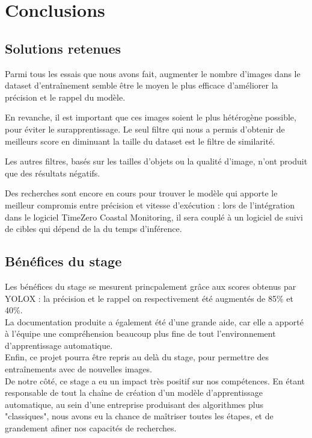 \chapter{Conclusions}

\section{Solutions retenues}

Parmi tous les essais que nous avons fait, augmenter le nombre d'images dans le dataset 
d'entraînement semble être le moyen le plus efficace d'améliorer la précision et le 
rappel du modèle. 

En revanche, il est important que ces images soient le plus hétérogène possible, 
pour éviter le surapprentissage. Le seul filtre qui nous a permis d'obtenir de 
meilleurs score en diminuant la taille du dataset est le filtre de similarité. 

Les autres filtres, basés sur les tailles d'objets ou la qualité d'image, 
n'ont produit que des résultats négatifs. 

Des recherches sont encore en cours pour trouver le modèle qui apporte 
le meilleur compromis entre précision et vitesse d'exécution : lors 
de l'intégration dans le logiciel TimeZero Coastal Monitoring, il sera couplé 
à un logiciel de suivi de cibles qui dépend de la du temps d'inférence. \\

\section{Bénéfices du stage}

Les bénéfices du stage se mesurent princpalement grâce aux scores obtenus 
par YOLOX : la précision et le rappel on respectivement été augmentés de 85\%
et 40\%. \\

La documentation produite a également été d'une grande aide, car elle a apporté à l'équipe une compréhension 
beaucoup plus fine de tout l'environnement d'apprentissage automatique. \\

Enfin, ce projet pourra être repris au delà du stage, pour permettre des 
entraînements avec de nouvelles images. \\

De notre côté, ce stage a eu un impact très positif sur nos compétences. 
En étant responsable de tout la chaîne de création d'un modèle d'apprentissage 
automatique, au sein d'une entreprise produisant des algorithmes plus "classiques", 
nous avons eu la chance de maîtriser toutes les étapes, et de grandement afiner
nos capacités de recherches.

